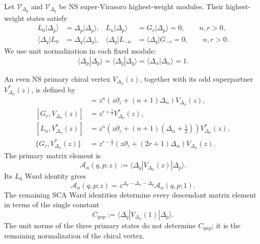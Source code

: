 \documentclass[11pt]{article}
\begin{document}
Let \(\mathcal V_{\Delta_p}\) and \(\mathcal V_{\Delta_q}\) be NS
super-Virasoro highest-weight modules.  Their highest-weight states satisfy
\begin{align}
 L_0|\Delta_p\rangle
 &=\Delta_p|\Delta_p\rangle,
 &
 L_n|\Delta_p\rangle
 &=
 G_r|\Delta_p\rangle=0,
 \qquad n,r>0,
 \label{eq:incoming-NS-primary}
 \\
 \langle\Delta_q|L_0
 &=\Delta_q\langle\Delta_q|,
 &
 \langle\Delta_q|L_{-n}
 &=
 \langle\Delta_q|G_{-r}=0,
 \qquad n,r>0.
 \label{eq:outgoing-NS-primary}
\end{align}
We use unit normalization in each fixed module:
\begin{equation}
 \langle\Delta_p|\Delta_p\rangle
 =
 \langle\Delta_q|\Delta_q\rangle
 =
 \langle\Delta_\alpha|\Delta_\alpha\rangle
 =1.
 \label{eq:abstract-highest-state-normalization}
\end{equation}

An even NS primary chiral vertex \(V_{\Delta_\alpha}(z)\), together with its
odd superpartner \(V_{\Delta_\alpha}^{*}(z)\), is defined by
\begin{align}
 [L_n,V_{\Delta_\alpha}(z)]
 &=
 z^n\left(
 z\partial_z+(n+1)\Delta_\alpha
 \right)V_{\Delta_\alpha}(z),
 \label{eq:abstract-primary-L-transformation}
 \\
 [G_r,V_{\Delta_\alpha}(z)]
 &=
 z^{r+\frac12}V_{\Delta_\alpha}^{*}(z),
 \label{eq:abstract-primary-G-transformation}
 \\
 [L_n,V_{\Delta_\alpha}^{*}(z)]
 &=
 z^n\left(
 z\partial_z+(n+1)\left(\Delta_\alpha+\frac12\right)
 \right)V_{\Delta_\alpha}^{*}(z),
 \label{eq:abstract-star-L-transformation}
 \\
 \{G_r,V_{\Delta_\alpha}^{*}(z)\}
 &=
 z^{r-\frac12}
 \left(
 z\partial_z+(2r+1)\Delta_\alpha
 \right)V_{\Delta_\alpha}(z).
 \label{eq:abstract-star-G-transformation}
\end{align}
The primary matrix element is
\begin{equation}
 \mathcal A_\alpha(q,p;z)
 :=
 \langle\Delta_q|
 V_{\Delta_\alpha}(z)
 |\Delta_p\rangle.
 \label{eq:abstract-primary-matrix-element}
\end{equation}
Its \(L_0\) Ward identity gives
\begin{equation}
 \mathcal A_\alpha(q,p;z)
 =
 z^{\Delta_q-\Delta_\alpha-\Delta_p}
 \mathcal A_\alpha(q,p;1).
 \label{eq:abstract-primary-z-dependence}
\end{equation}
The remaining SCA Ward identities determine every descendant matrix element
in terms of the single constant
\begin{equation}
 C_{q\alpha p}
 :=
 \langle\Delta_q|
 V_{\Delta_\alpha}(1)
 |\Delta_p\rangle.
 \label{eq:abstract-chiral-vertex-constant}
\end{equation}
The unit norms of the three primary states do not determine
\(C_{q\alpha p}\); it is the remaining normalization of the chiral vertex.
\end{document}
